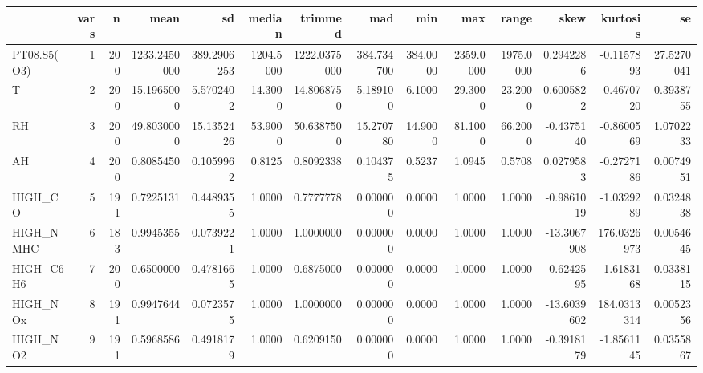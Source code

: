 
\begin{tabular}{l|r|r|r|r|r|r|r|r|r|r|r|r|r}
\hline
  & vars & n & mean & sd & median & trimmed & mad & min & max & range & skew & kurtosis & se\\
\hline
PT08.S5(O3) & 1 & 200 & 1233.2450000 & 389.2906253 & 1204.5000 & 1222.0375000 & 384.734700 & 384.0000 & 2359.0000 & 1975.0000 & 0.2942286 & -0.1157893 & 27.5270041\\
\hline
T & 2 & 200 & 15.1965000 & 5.5702402 & 14.3000 & 14.8068750 & 5.189100 & 6.1000 & 29.3000 & 23.2000 & 0.6005822 & -0.4670720 & 0.3938755\\
\hline
RH & 3 & 200 & 49.8030000 & 15.1352426 & 53.9000 & 50.6387500 & 15.270780 & 14.9000 & 81.1000 & 66.2000 & -0.4375140 & -0.8600569 & 1.0702233\\
\hline
AH & 4 & 200 & 0.8085450 & 0.1059962 & 0.8125 & 0.8092338 & 0.104375 & 0.5237 & 1.0945 & 0.5708 & 0.0279583 & -0.2727186 & 0.0074951\\
\hline
HIGH\_CO & 5 & 191 & 0.7225131 & 0.4489355 & 1.0000 & 0.7777778 & 0.000000 & 0.0000 & 1.0000 & 1.0000 & -0.9861019 & -1.0329289 & 0.0324838\\
\hline
HIGH\_NMHC & 6 & 183 & 0.9945355 & 0.0739221 & 1.0000 & 1.0000000 & 0.000000 & 0.0000 & 1.0000 & 1.0000 & -13.3067908 & 176.0326973 & 0.0054645\\
\hline
HIGH\_C6H6 & 7 & 200 & 0.6500000 & 0.4781665 & 1.0000 & 0.6875000 & 0.000000 & 0.0000 & 1.0000 & 1.0000 & -0.6242595 & -1.6183168 & 0.0338115\\
\hline
HIGH\_NOx & 8 & 191 & 0.9947644 & 0.0723575 & 1.0000 & 1.0000000 & 0.000000 & 0.0000 & 1.0000 & 1.0000 & -13.6039602 & 184.0313314 & 0.0052356\\
\hline
HIGH\_NO2 & 9 & 191 & 0.5968586 & 0.4918179 & 1.0000 & 0.6209150 & 0.000000 & 0.0000 & 1.0000 & 1.0000 & -0.3918179 & -1.8561145 & 0.0355867\\
\hline
\end{tabular}
